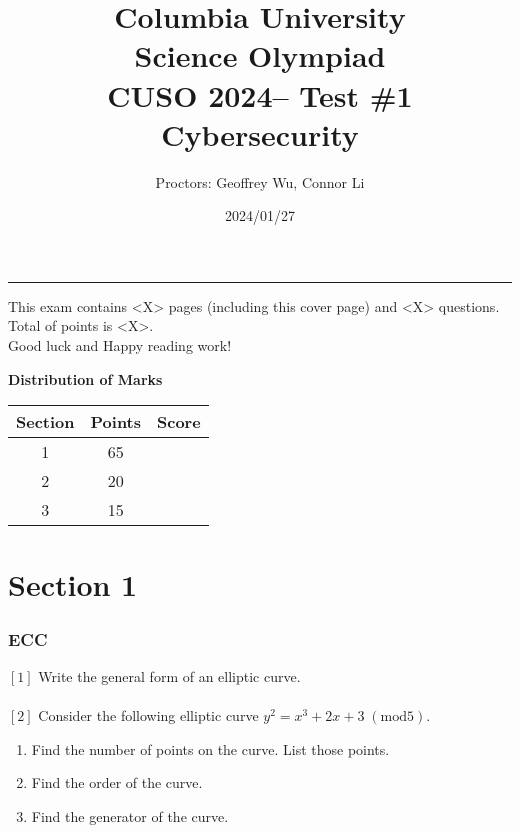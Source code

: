 \documentclass[letterpaper,12pt,addpoints]{exam}
\newcommand{\university}{Columbia University}
\newcommand{\faculty}{Science Olympiad}
\newcommand{\class}{CUSO 2024}
\newcommand{\examnum}{Test \#1}
\newcommand{\content}{Cybersecurity}
\newcommand{\examdate}{2024/01/27}
\begin{document}
\title{\Large \textbf{\university\\ \faculty\\
\bigskip
\class -- \examnum \\ \content}}
\author{Proctors: Geoffrey Wu, Connor Li}
\date{\examdate}
\maketitle
\begin{flushleft}
\medskip
{}
\end{flushleft}
\noindent \rule{\textwidth}{1pt}

\noindent This exam contains <X> pages (including this cover page) and <X> questions. Total of points is <X>.\\
Good luck and Happy reading work!

\begin{center}
\textbf{Distribution of Marks}\\
\end{center}
\begin{center}
\begin{tabular} {| c | c | c |}
    \hline
    Section & Points & Score \\
    \hline
    1 & 65 & \\
    \hline
    2 & 20 & \\
    \hline
    3 & 15 & \\
    \hline
\end{tabular}
\end{center}
\clearpage

\section*{Section 1}
\subsubsection*{ECC}
$[1]$ Write the general form of an elliptic curve.\\
\\
$[2]$ Consider the following elliptic curve $y^2 = x^3 + 2x + 3\;(\text{mod} 5)$. 
\begin{enumerate}
    \item Find the number of points on the curve. List those points.
    \item Find the order of the curve.
    \item Find the generator of the curve.
\end{enumerate}
\end{document}
